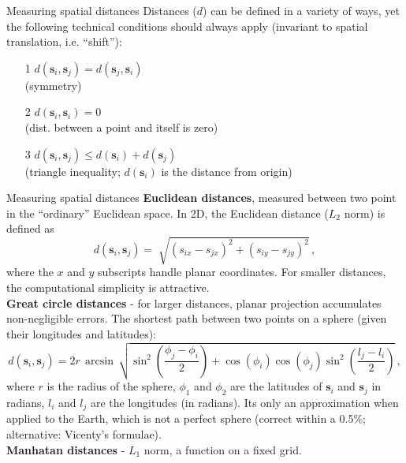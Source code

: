 \documentclass{beamer}
\begin{document}
\begin{frame}{Measuring spatial distances}
Distances ($d$) can be defined in a variety of ways, yet the following technical conditions should always apply (invariant to spatial translation, i.e. ``shift''):\\
\medskip
\begin{enumerate} 
\item[1] $d(\bm{s}_i, \bm{s}_j) = d(\bm{s}_j, \bm{s}_i)$ \\ \smallskip (symmetry) 
\medskip
\item[2] $d(\bm{s}_i, \bm{s}_i) = 0$  \\ \smallskip (dist. between a point and itself is zero) 
\medskip
\item[3] $d(\bm{s}_i, \bm{s}_j) \leq d(\bm{s}_i) + d(\bm{s}_j)$  \\ \smallskip (triangle inequality; 
$d(\bm{s}_i)$ is the distance from origin) 
\end{enumerate}
\end{frame}
\begin{frame}{Measuring spatial distances}
\small{\textbf{Euclidean distances}, measured between two point in the ``ordinary'' Euclidean space. In 2D, the Euclidean distance ($L_2$ norm) is defined as 
$$
d(\bm{s}_i, \bm{s}_j) = \sqrt[]{(s_{ix}-s_{jx})^2+(s_{iy}-s_{jy})^2}\,,
$$
where the $x$ and $y$ subscripts handle planar coordinates. For smaller distances, the computational simplicity is attractive.\\
\medskip
\textbf{Great circle distances} - for larger distances, planar projection accumulates non-negligible errors. The shortest path between two points on a sphere (given their longitudes and latitudes): 
$$
d(\bm{s}_i, \bm{s}_j) = 2r \, \arcsin \,
 \sqrt{ \sin^2 \left( \frac{\phi_j-\phi_i}{2} \right)
       + \cos(\phi_i) \cos(\phi_j)
       \sin^2 \left( \frac{l_j-l_i}{2} \right) }\,,
$$
where $r$ is the radius of the sphere, $\phi_1$ and $\phi_2$ are the latitudes of $\bm{s}_i$ and $\bm{s}_j$ in radians, $l_i$ and $l_j$ are the longitudes (in radians). Its only an approximation when applied to the Earth, which is not a perfect sphere (correct within a 0.5\%; alternative: Vicenty's formulae).\\
\medskip
\textbf{Manhatan distances} - $L_1$ norm, a function on a fixed grid.
}
\end{frame}
\end{document}
